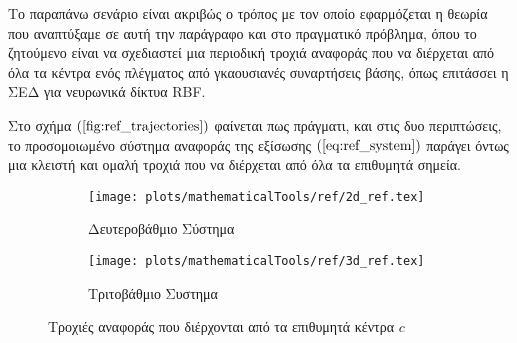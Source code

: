Το παραπάνω σενάριο είναι ακριβώς ο τρόπος με τον οποίο εφαρμόζεται η θεωρία που αναπτύξαμε σε αυτή την παράγραφο και στο πραγματικό πρόβλημα, όπου το ζητούμενο είναι να σχεδιαστεί μια περιοδική τροχιά αναφοράς που να διέρχεται από όλα τα κέντρα ενός πλέγματος από γκαουσιανές συναρτήσεις βάσης, όπως επιτάσσει η ΣΕΔ για νευρωνικά δίκτυα RBF.

Στο σχήμα $(\ref{fig:ref_trajectories})$ φαίνεται πως πράγματι, και στις δυο περιπτώσεις, το προσομοιωμένο σύστημα αναφοράς της εξίσωσης $(\ref{eq:ref_system})$ παράγει όντως μια κλειστή και ομαλή τροχιά που να διέρχεται από όλα τα επιθυμητά σημεία.

\begin{figure}
	\begin{subfigure}{0.5\textwidth}
		\texttt{[image: plots/mathematicalTools/ref/2d\_ref.tex]}
		\caption{Δευτεροβάθμιο Σύστημα}
	\end{subfigure}
	\begin{subfigure}{0.5\textwidth}
		\texttt{[image: plots/mathematicalTools/ref/3d\_ref.tex]}
		\caption{Τριτοβάθμιο Συστημα}
	\end{subfigure}
	\caption{ Τροχιές αναφοράς που διέρχονται από τα επιθυμητά κέντρα $c$ }
	\label{fig:ref_trajectories}
\end{figure}